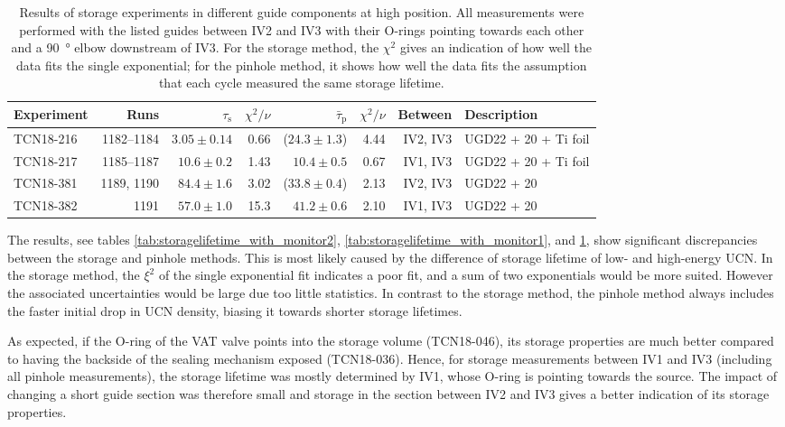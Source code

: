 \documentclass[10pt,letterpaper]{article}
\begin{document}
\begin{table}
\caption{Results of storage experiments in different guide components at high position. All measurements were performed with the listed guides between IV2 and IV3 with their O-rings pointing towards each other and a \SI{90}{\degree} elbow downstream of IV3. For the storage method, the $\chi^2$ gives an indication of how well the data fits the single exponential; for the pinhole method, it shows how well the data fits the assumption that each cycle measured the same storage lifetime.}
\begin{tabular}{l r r r r r r l}
\toprule
Experiment & Runs & $\tau_\mathrm{s}$ & $\chi^2/\nu$ & $\bar{\tau}_\mathrm{p}$ & $\chi^2/\nu$ & Between & Description \\
\midrule
TCN18-216 & 1182--1184 & $3.05 \pm 0.14$ & 0.66 & ($24.3 \pm 1.3$) & 4.44 & IV2, IV3 & UGD22 + 20 + Ti foil \\
TCN18-217 & 1185--1187 & $10.6 \pm 0.2$ & 1.43 & $10.4 \pm 0.5$ & 0.67 & IV1, IV3 & UGD22 + 20 + Ti foil \\
TCN18-381 & 1189, 1190 & $84.4 \pm 1.6$ & 3.02 & ($33.8 \pm 0.4$) & 2.13 & IV2, IV3 & UGD22 + 20 \\
TCN18-382 & 1191 & $57.0 \pm 1.0$ & 15.3 & $41.2 \pm 0.6$ & 2.10 & IV1, IV3 & UGD22 + 20 \\
\bottomrule
\end{tabular}
\label{tab:storagelifetime_with_monitor3}
\end{table}

The results, see tables \ref{tab:storagelifetime_with_monitor2}, \ref{tab:storagelifetime_with_monitor1}, and \ref{tab:storagelifetime_with_monitor3}, show significant discrepancies between the storage and pinhole methods. This is most likely caused by the difference of storage lifetime of low- and high-energy UCN. In the storage method, the $\xi^2$ of the single exponential fit indicates a poor fit, and a sum of two exponentials would be more suited. However the associated uncertainties would be large due too little statistics. In contrast to the storage method, the pinhole method always includes the faster initial drop in UCN density, biasing it towards shorter storage lifetimes.

As expected, if the O-ring of the VAT valve points into the storage volume (TCN18-046), its storage properties are much better compared to having the backside of the sealing mechanism exposed (TCN18-036). Hence, for storage measurements between IV1 and IV3 (including all pinhole measurements), the storage lifetime was mostly determined by IV1, whose O-ring is pointing towards the source. The impact of changing a short guide section was therefore small and storage in the section between IV2 and IV3 gives a better indication of its storage properties.
\end{document}
